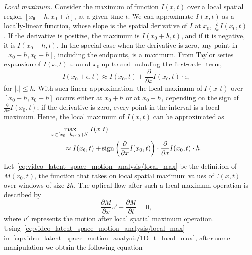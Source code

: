 \textit{Local maximum.} Consider the maximum of function $I(x,t)$ over a local spatial region $[x_0-h, x_0+h]$, at a given time $t$. We can approximate $I(x,t)$ as a locally-linear function, whose slope is the spatial derivative of $I$ at $x_0$, $\frac{\partial}{\partial x}I(x_0,t)$. If the derivative is positive, the maximum is $I(x_0+h,t)$, and if it is negative, it is $I(x_0-h,t)$. In the special case when the derivative is zero, any point in $[x_0-h, x_0+h]$, including the endpoints, is a maximum. From  Taylor series expansion of $I(x,t)$ around $x_0$ up to and including the first-order term,
\begin{equation}
    I(x_0 \pm \epsilon,t) \approx I(x_0,t) \pm \frac{\partial}{\partial x}I(x_0,t)\cdot \epsilon,
\end{equation}
for $|\epsilon| \leq h$. With such linear approximation, the local maximum of $I(x,t)$ over $[x_0-h, x_0+h]$ occurs either at $x_0+h$ or at $x_0-h$, depending on the sign of $\frac{\partial}{\partial x}I(x_0,t)$; if the derivative is zero, every point in the interval is a local maximum. Hence, the local maximum of $I(x,t)$ can be approximated as
\begin{equation}
\begin{split}
    &\max_{x\in[x_0-h, x_0+h]} I(x,t) \\
    & \qquad \approx I(x_0,t) + \operatorname{sign}\left(\frac{\partial}{\partial x}I(x_0,t)\right) \cdot \frac{\partial}{\partial x}I(x_0,t) \cdot h.
\end{split}
\label{eq:video_latent_space_motion_analysis/local_max}
\end{equation}
Let~\cref{eq:video_latent_space_motion_analysis/local_max} be the definition of $M(x_0,t)$, the function that takes on local spatial maximum values of $I(x,t)$ over windows of size $2h$. The optical flow after such a local maximum operation is described by
\begin{equation}
    \frac{\partial M}{\partial x}v'  + \frac{\partial M}{\partial t} = 0,
    \label{eq:video_latent_space_motion_analysis/1D+t_local_max}
\end{equation}
where $v'$ represents the motion after local spatial maximum operation. Using~\cref{eq:video_latent_space_motion_analysis/local_max} in~\cref{eq:video_latent_space_motion_analysis/1D+t_local_max}, after some manipulation we obtain the following equation
